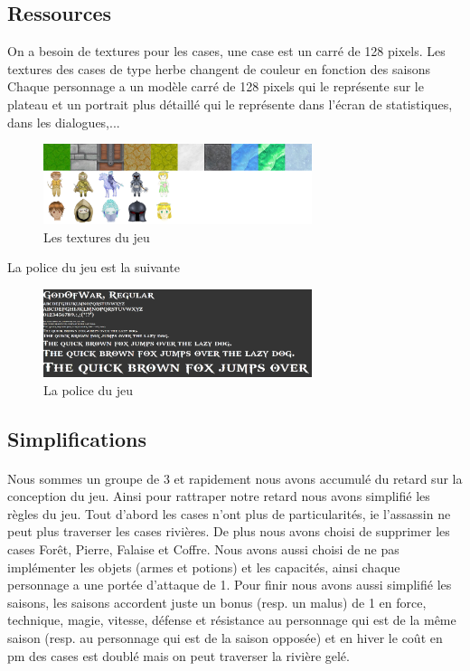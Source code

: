 \documentclass[a4paper,12pt]{article}
\begin{document}
\subsection{Ressources}
On a besoin de textures pour les cases, une case est un carré de 128 pixels. Les textures des cases de type herbe changent de couleur en fonction des saisons
Chaque personnage a un modèle carré de 128 pixels qui le représente sur le plateau et un portrait plus détaillé qui le représente dans l'écran de statistiques, dans les dialogues,...
\begin{figure}[ht]
\begin{center}
\includegraphics[width=0.7\textwidth]{textures.png}
\caption{Les textures du jeu}
\end{center}
\end{figure}
\newpage
La police du jeu est la suivante
\begin{figure}[ht]
\begin{center}
\includegraphics[width=0.7\textwidth]{ressource_police.png}
\caption{La police du jeu}
\end{center}
\end{figure}
\newpage
\subsection{Simplifications}
\paragraph{}Nous sommes un groupe de 3 et rapidement nous avons accumulé du retard sur la conception du jeu. Ainsi pour rattraper notre retard nous avons simplifié les règles du jeu.
Tout d'abord les cases n'ont plus de particularités, ie l'assassin ne peut plus traverser les cases rivières.
De plus nous avons choisi de supprimer les cases Forêt, Pierre, Falaise et Coffre.
Nous avons aussi choisi de ne pas implémenter les objets (armes et potions) et les capacités, ainsi chaque personnage a une portée d'attaque de 1. 
Pour finir nous avons aussi simplifié les saisons, les saisons accordent juste un bonus (resp. un malus) de 1 en force, technique, magie, vitesse, défense et résistance au personnage qui est de la même saison (resp. au personnage qui est de la saison opposée) et en hiver le coût en pm des cases est doublé mais on peut traverser la rivière gelé.
\end{document}
